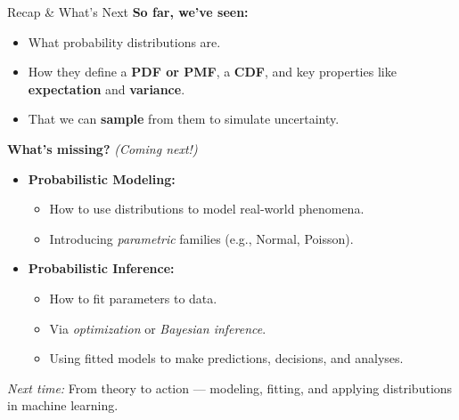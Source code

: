 \documentclass{beamer}
\begin{document}
\begin{frame}{Recap \& What’s Next}
\textbf{So far, we've seen:}
\begin{itemize}
  \item What probability distributions are.
  \item How they define a \textbf{PDF or PMF}, a \textbf{CDF}, and key properties like \textbf{expectation} and \textbf{variance}.
  \item That we can \textbf{sample} from them to simulate uncertainty.
\end{itemize}

\vspace{1em}
\textbf{What’s missing?} \textit{(Coming next!)}
\begin{itemize}
  \item \textbf{Probabilistic Modeling:}
    \begin{itemize}
      \item How to use distributions to model real-world phenomena.
      \item Introducing \textit{parametric} families (e.g., Normal, Poisson).
    \end{itemize}
  \item \textbf{Probabilistic Inference:}
    \begin{itemize}
      \item How to fit parameters to data.
      \item Via \textit{optimization} or \textit{Bayesian inference}.
      \item Using fitted models to make predictions, decisions, and analyses.
    \end{itemize}
\end{itemize}

\vspace{1em}
\textit{Next time:} From theory to action — modeling, fitting, and applying distributions in machine learning.
\end{frame}
\end{document}

